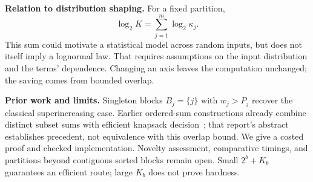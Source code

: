 \documentclass[10pt]{article}
\begin{document}
\textbf{Relation to distribution shaping.}
For a fixed partition,
\[
 \log_2K=\sum_{j=1}^m\log_2\kappa_j.
\]
This sum could motivate a statistical model across random inputs,
but does not itself imply a lognormal law. That requires assumptions on
the input distribution and the terms' dependence.
Changing an axis leaves the computation unchanged; the saving comes
from bounded overlap.

\textbf{Prior work and limits.}
Singleton blocks $B_j=\{j\}$ with $w_j>P_j$ recover the classical superincreasing
case. Earlier ordered-sum constructions already combine distinct
subset sums with efficient knapsack decision~\cite{ordered}; that report's
abstract establishes precedent, not equivalence with this overlap bound.
We give a costed proof and checked implementation.
Novelty assessment, comparative timings, and partitions beyond contiguous
sorted blocks remain open. Small $2^b+K_b$ guarantees an efficient route;
large $K_b$ does not prove hardness.
\end{document}
